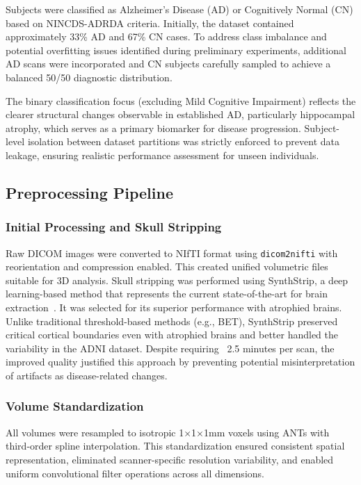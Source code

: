 \documentclass[12pt, a4paper]{article}
\begin{document}
Subjects were classified as Alzheimer's Disease (AD) or Cognitively Normal (CN) based on NINCDS-ADRDA criteria. Initially, the dataset contained approximately 33\% AD and 67\% CN cases. To address class imbalance and potential overfitting issues identified during preliminary experiments, additional AD scans were incorporated and CN subjects carefully sampled to achieve a balanced 50/50 diagnostic distribution.

The binary classification focus (excluding Mild Cognitive Impairment) reflects the clearer structural changes observable in established AD, particularly hippocampal atrophy, which serves as a primary biomarker for disease progression. Subject-level isolation between dataset partitions was strictly enforced to prevent data leakage, ensuring realistic performance assessment for unseen individuals.

\subsection{Preprocessing Pipeline}

\subsubsection{Initial Processing and Skull Stripping}

Raw DICOM images were converted to NIfTI format using \texttt{dicom2nifti} with reorientation and compression enabled. This created unified volumetric files suitable for 3D analysis. Skull stripping was performed using SynthStrip, a deep learning-based method that represents the current state-of-the-art for brain extraction~\cite{hoopes2022synthstrip}. It was selected for its superior performance with atrophied brains. Unlike traditional threshold-based methods (e.g., BET), SynthStrip preserved critical cortical boundaries even with atrophied brains and better handled the variability in the ADNI dataset. Despite requiring ~2.5 minutes per scan, the improved quality justified this approach by preventing potential misinterpretation of artifacts as disease-related changes.

\subsubsection{Volume Standardization}

All volumes were resampled to isotropic 1×1×1mm voxels using ANTs with third-order spline interpolation. This standardization ensured consistent spatial representation, eliminated scanner-specific resolution variability, and enabled uniform convolutional filter operations across all dimensions.
\end{document}
